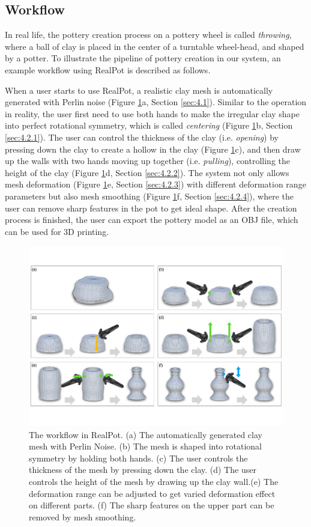 \documentclass{svjour3}                     %
\begin{document}
\subsection{Workflow}
\label{sec:3.2}
In real life, the pottery creation process on a pottery wheel is called \textit{throwing}, where a ball of clay is placed in the center of a turntable wheel-head, and shaped by a potter.
To illustrate the pipeline of pottery creation in our system, an example workflow using RealPot is described as follows.

When a user starts to use RealPot, a realistic clay mesh is automatically generated with Perlin noise (Figure \ref{fig:workflow}a, Section \ref{sec:4.1}). 
Similar to the operation in reality, the user first need to use both hands to make the irregular clay shape into perfect rotational symmetry, which is called \textit{centering} (Figure \ref{fig:workflow}b, Section \ref{sec:4.2.1}).
The user can control the thickness of the clay (i.e. \textit{opening}) by pressing down the clay to create a hollow in the clay (Figure \ref{fig:workflow}c), 
and then draw up the walls with two hands moving up together (i.e. \textit{pulling}), controlling the height of the clay (Figure \ref{fig:workflow}d, Section \ref{sec:4.2.2}).
The system not only allows mesh deformation (Figure \ref{fig:workflow}e, Section \ref{sec:4.2.3}) with different deformation range parameters but also mesh smoothing (Figure \ref{fig:workflow}f, Section \ref{sec:4.2.4}), where the user can remove sharp features in the pot to get ideal shape.
After the creation process is finished, the user can export the pottery model as an OBJ file, which can be used for 3D printing.

\begin{figure}
\includegraphics[width=\textwidth]{fig3}
\caption{The workflow in RealPot. (a) The automatically generated clay mesh with Perlin Noise. (b) The mesh is shaped into rotational symmetry by holding both hands. (c) The user controls the thickness of the mesh by pressing down the clay. (d) The user controls the height of the mesh by drawing up the clay wall.(e) The deformation range can be adjusted to get varied deformation effect on different parts. (f) The sharp features on the upper part can be removed by mesh smoothing.}
\label{fig:workflow}
\end{figure}
\end{document}
